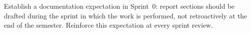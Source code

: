 \begin{paaction}
Establish a documentation expectation in Sprint~0: report sections should be drafted during the sprint in which the work is performed, not retroactively at the end of the semester. Reinforce this expectation at every sprint review.
\end{paaction}


